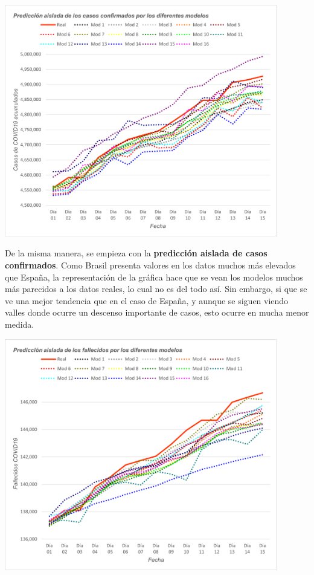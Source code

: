 \documentclass[12pt,a4paper, xcolor=table]{article}
\begin{document}
            \begin{center}
                \centering
                \includegraphics[width=450px]{img/pred_a_conf_BZ.png}
            \end{center}

            De la misma manera, se empieza con la \textbf{predicción aislada de casos confirmados}. Como Brasil presenta valores en los datos muchos más elevados que España, la representación de la gráfica hace que se vean los modelos muchos más parecidos a los datos reales, lo cual no es del todo así. Sin embargo, si que se ve una mejor tendencia que en el caso de España, y aunque se siguen viendo valles donde ocurre un descenso importante de casos, esto ocurre en mucha menor medida.

            \begin{center}
                \centering
                \includegraphics[width=450px]{img/pred_a_fall_BZ.png}
            \end{center}
\end{document}
